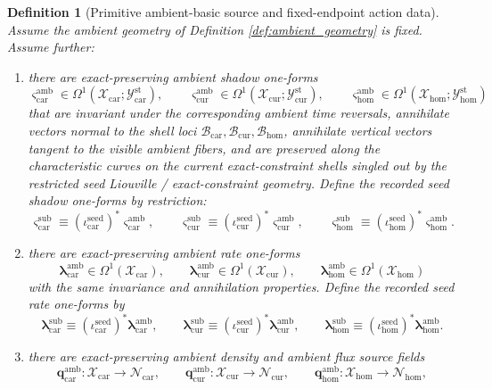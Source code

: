 \documentclass[11pt]{article}
\newcommand{\TensorStatTagClass}{\mathcal Y_{\mathrm{car}}^{\mathrm{st}}}
\newcommand{\CurStatTagClass}{\mathcal Y_{\mathrm{cur}}^{\mathrm{st}}}
\newcommand{\HomStatTagClass}{\mathcal Y_{\mathrm{hom}}^{\mathrm{st}}}
\newcommand{\TensorDensityClass}{\mathscr N_{\mathrm{car}}}
\newcommand{\CurDensityClass}{\mathscr N_{\mathrm{cur}}}
\newcommand{\HomDensityClass}{\mathscr N_{\mathrm{hom}}}
\newcommand{\TensorSeedSpace}{\mathcal B_{\mathrm{car}}}
\newcommand{\CurSeedSpace}{\mathcal B_{\mathrm{cur}}}
\newcommand{\HomSeedSpace}{\mathcal B_{\mathrm{hom}}}
\newcommand{\TensorSeedShadowForm}{\boldsymbol{\varsigma}_{\mathrm{car}}^{\mathrm{sub}}}
\newcommand{\CurSeedShadowForm}{\boldsymbol{\varsigma}_{\mathrm{cur}}^{\mathrm{sub}}}
\newcommand{\HomSeedShadowForm}{\boldsymbol{\varsigma}_{\mathrm{hom}}^{\mathrm{sub}}}
\newcommand{\TensorSeedRateForm}{\boldsymbol{\lambda}_{\mathrm{car}}^{\mathrm{sub}}}
\newcommand{\CurSeedRateForm}{\boldsymbol{\lambda}_{\mathrm{cur}}^{\mathrm{sub}}}
\newcommand{\HomSeedRateForm}{\boldsymbol{\lambda}_{\mathrm{hom}}^{\mathrm{sub}}}
\newcommand{\TensorAmbientSpace}{\mathcal X_{\mathrm{car}}}
\newcommand{\CurAmbientSpace}{\mathcal X_{\mathrm{cur}}}
\newcommand{\HomAmbientSpace}{\mathcal X_{\mathrm{hom}}}
\newcommand{\TensorSeedInc}{\iota_{\mathrm{car}}^{\mathrm{seed}}}
\newcommand{\CurSeedInc}{\iota_{\mathrm{cur}}^{\mathrm{seed}}}
\newcommand{\HomSeedInc}{\iota_{\mathrm{hom}}^{\mathrm{seed}}}
\newcommand{\TensorAmbientShadowForm}{\boldsymbol{\varsigma}_{\mathrm{car}}^{\mathrm{amb}}}
\newcommand{\CurAmbientShadowForm}{\boldsymbol{\varsigma}_{\mathrm{cur}}^{\mathrm{amb}}}
\newcommand{\HomAmbientShadowForm}{\boldsymbol{\varsigma}_{\mathrm{hom}}^{\mathrm{amb}}}
\newcommand{\TensorAmbientRateForm}{\boldsymbol{\lambda}_{\mathrm{car}}^{\mathrm{amb}}}
\newcommand{\CurAmbientRateForm}{\boldsymbol{\lambda}_{\mathrm{cur}}^{\mathrm{amb}}}
\newcommand{\HomAmbientRateForm}{\boldsymbol{\lambda}_{\mathrm{hom}}^{\mathrm{amb}}}
\newcommand{\TensorAmbientDensitySource}{\boldsymbol{q}_{\mathrm{car}}^{\mathrm{amb}}}
\newcommand{\CurAmbientDensitySource}{\boldsymbol{q}_{\mathrm{cur}}^{\mathrm{amb}}}
\newcommand{\HomAmbientDensitySource}{\boldsymbol{q}_{\mathrm{hom}}^{\mathrm{amb}}}
\newtheorem{definition}{Definition}
\begin{document}
\begin{definition}[Primitive ambient-basic source and fixed-endpoint action data]
\label{def:ambient_basic}
Assume the ambient geometry of Definition \ref{def:ambient_geometry} is fixed. Assume further:
\begin{enumerate}
    \item there are exact-preserving ambient shadow one-forms
    \[
    \TensorAmbientShadowForm\in\Omega^1(\TensorAmbientSpace;\TensorStatTagClass),\qquad
    \CurAmbientShadowForm\in\Omega^1(\CurAmbientSpace;\CurStatTagClass),\qquad
    \HomAmbientShadowForm\in\Omega^1(\HomAmbientSpace;\HomStatTagClass)
    \]
    that are invariant under the corresponding ambient time reversals, annihilate vectors normal to the shell loci \(\TensorSeedSpace,\CurSeedSpace,\HomSeedSpace\), annihilate vertical vectors tangent to the visible ambient fibers, and are preserved along the characteristic curves on the current exact-constraint shells singled out by the restricted seed Liouville / exact-constraint geometry. Define the recorded seed shadow one-forms by restriction:
    \begin{equation}
    \TensorSeedShadowForm\equiv(\TensorSeedInc)^*\TensorAmbientShadowForm,\qquad
    \CurSeedShadowForm\equiv(\CurSeedInc)^*\CurAmbientShadowForm,\qquad
    \HomSeedShadowForm\equiv(\HomSeedInc)^*\HomAmbientShadowForm.
    \label{eq:seed_shadow_from_ambient}
    \end{equation}
    \item there are exact-preserving ambient rate one-forms
    \[
    \TensorAmbientRateForm\in\Omega^1(\TensorAmbientSpace),\qquad
    \CurAmbientRateForm\in\Omega^1(\CurAmbientSpace),\qquad
    \HomAmbientRateForm\in\Omega^1(\HomAmbientSpace)
    \]
    with the same invariance and annihilation properties. Define the recorded seed rate one-forms by
    \begin{equation}
    \TensorSeedRateForm\equiv(\TensorSeedInc)^*\TensorAmbientRateForm,\qquad
    \CurSeedRateForm\equiv(\CurSeedInc)^*\CurAmbientRateForm,\qquad
    \HomSeedRateForm\equiv(\HomSeedInc)^*\HomAmbientRateForm.
    \label{eq:seed_rate_from_ambient}
    \end{equation}
    \item there are exact-preserving ambient density and ambient flux source fields
    \[
    \TensorAmbientDensitySource:\TensorAmbientSpace\to\TensorDensityClass,\qquad
    \CurAmbientDensitySource:\CurAmbientSpace\to\CurDensityClass,\qquad
    \HomAmbientDensitySource:\HomAmbientSpace\to\HomDensityClass,
    \]

\end{enumerate}
\end{definition}
\end{document}
